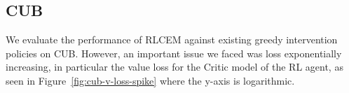
\subsection{CUB}

We evaluate the performance of RLCEM against existing 
greedy intervention policies on CUB. However, an important issue 
we faced was loss exponentially increasing, 
in particular the value loss for the Critic model of the
RL agent, as seen in Figure~\ref{fig:cub-v-loss-spike} where the y-axis is 
logarithmic.


